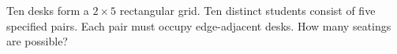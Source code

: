 Ten desks form a $2\times5$ rectangular grid. Ten distinct students consist of five specified pairs. Each pair must occupy edge-adjacent desks. How many seatings are possible?
